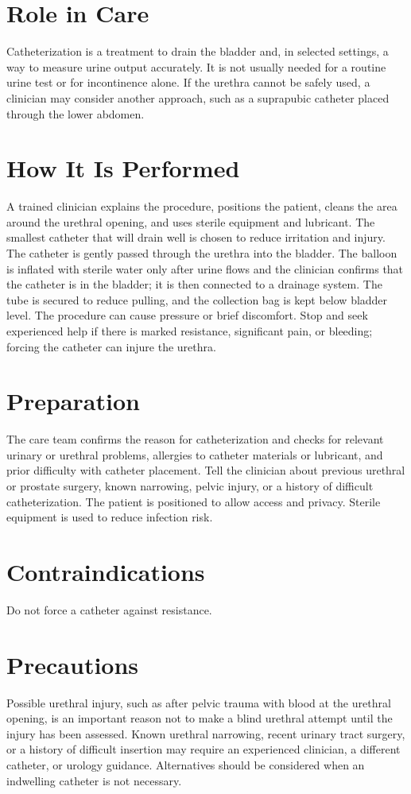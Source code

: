 \section*{Role in Care}
Catheterization is a treatment to drain the bladder and, in selected settings, a way to measure urine output accurately. It is not usually needed for a routine urine test or for incontinence alone. If the urethra cannot be safely used, a clinician may consider another approach, such as a suprapubic catheter placed through the lower abdomen.

\section*{How It Is Performed}
A trained clinician explains the procedure, positions the patient, cleans the area around the urethral opening, and uses sterile equipment and lubricant. The smallest catheter that will drain well is chosen to reduce irritation and injury. The catheter is gently passed through the urethra into the bladder. The balloon is inflated with sterile water only after urine flows and the clinician confirms that the catheter is in the bladder; it is then connected to a drainage system. The tube is secured to reduce pulling, and the collection bag is kept below bladder level. The procedure can cause pressure or brief discomfort. Stop and seek experienced help if there is marked resistance, significant pain, or bleeding; forcing the catheter can injure the urethra.

\section*{Preparation}
The care team confirms the reason for catheterization and checks for relevant urinary or urethral problems, allergies to catheter materials or lubricant, and prior difficulty with catheter placement. Tell the clinician about previous urethral or prostate surgery, known narrowing, pelvic injury, or a history of difficult catheterization. The patient is positioned to allow access and privacy. Sterile equipment is used to reduce infection risk.

\section*{Contraindications}
Do not force a catheter against resistance.

\section*{Precautions}
Possible urethral injury, such as after pelvic trauma with blood at the urethral opening, is an important reason not to make a blind urethral attempt until the injury has been assessed. Known urethral narrowing, recent urinary tract surgery, or a history of difficult insertion may require an experienced clinician, a different catheter, or urology guidance. Alternatives should be considered when an indwelling catheter is not necessary.

